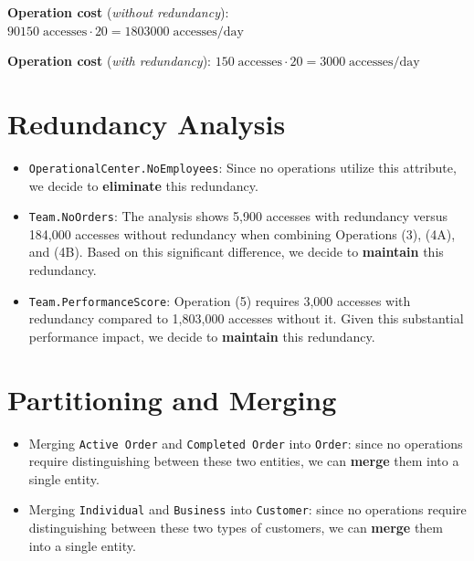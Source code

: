     \textbf{Operation cost} (\textit{without redundancy}): $90150 \; \text{accesses} \cdot 20 = 1803000 \; \text{accesses/day}$

    \textbf{Operation cost} (\textit{with redundancy}): $150 \; \text{accesses} \cdot 20 = 3000 \; \text{accesses/day}$  

    

\section*{Redundancy Analysis}
\begin{itemize}[label=-]
\item \texttt{OperationalCenter.NoEmployees}: Since no operations utilize this attribute, we decide to \textbf{eliminate} this redundancy.
\item \texttt{Team.NoOrders}: The analysis shows 5,900 accesses with redundancy versus 184,000 accesses without redundancy when combining Operations (3), (4A), and (4B). Based on this significant difference, we decide to \textbf{maintain} this redundancy.
\item \texttt{Team.PerformanceScore}: Operation (5) requires 3,000 accesses with redundancy compared to 1,803,000 accesses without it. Given this substantial performance impact, we decide to \textbf{maintain} this redundancy.
\end{itemize}


\section*{Partitioning and Merging}
\begin{itemize}[label=-]
    \item Merging \texttt{Active Order} and \texttt{Completed Order} into \texttt{Order}: since no operations require distinguishing between these two entities, we can \textbf{merge} them into a single entity.
    \item Merging \texttt{Individual} and \texttt{Business} into \texttt{Customer}: since no operations require distinguishing between these two types of customers, we can \textbf{merge} them into a single entity.
\end{itemize}

